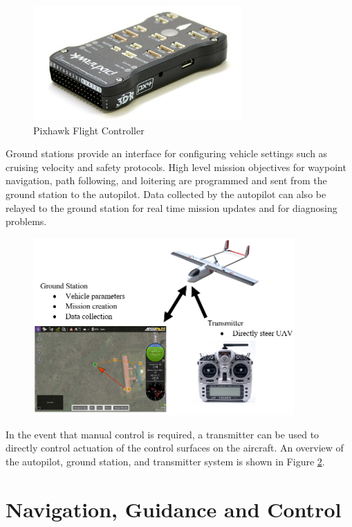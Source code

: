 \documentclass[numbered,pdftex]{ohio-etd}
\begin{document}
\begin{figure}[h!]
	\centering
	\includegraphics[width=8cm]{PaperFigures/pixhawk}
	\caption{Pixhawk Flight Controller}
	\label{fig:pixhawk}
\end{figure}


Ground stations provide an interface for configuring vehicle settings such as cruising velocity and safety protocols. High level mission objectives for waypoint navigation, path following, and loitering are programmed and sent from the ground station to the autopilot. Data collected by the autopilot can also be relayed to the ground station for real time mission updates and for diagnosing problems. 

\begin{figure}
	\centering
	\includegraphics[width=10cm]{PaperFigures/groundUAVTransmitter}
	\caption{}
	\label{fig:grounduavtransmitter}
\end{figure}
In the event that manual control is required, a transmitter can be used to directly control actuation of the control surfaces on the aircraft. An overview of the autopilot, ground station, and transmitter system is shown in Figure \ref{fig:grounduavtransmitter}.





\section{Navigation, Guidance and Control} \label{NGC}
\end{document}
